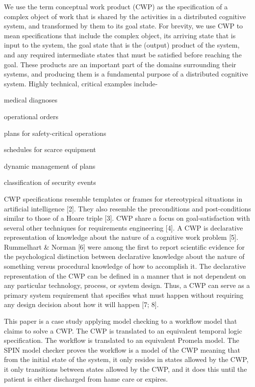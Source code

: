 We use the term conceptual work product (CWP) as the specification of a complex object of work that is shared by the activities in a distributed cognitive system, and transformed by them to its goal state. For brevity, we use CWP to mean specifications that include the complex object, its arriving state that is input to the system, the goal state that is the (output) product of the system, and any required intermediate states that must be satisfied before reaching the goal. These products are an important part of the domains surrounding their systems, and producing them is a fundamental purpose of a distributed cognitive system. Highly technical, critical examples include- 
\begin{compactitem}
\item medical diagnoses 
\item operational orders
\item plans for safety-critical operations 
\item schedules for scarce equipment
\item dynamic management of plans
\item classification of security events
\end{compactitem}
CWP specifications resemble templates or frames for stereotypical situations in artificial intelligence [2]. They also resemble the preconditions and post-conditions similar to those of a Hoare triple [3]. CWP share a focus on goal-satisfaction with several other techniques for requirements engineering [4]. 
A CWP is declarative representation of knowledge about the nature of a cognitive work problem [5]. Rummelhart & Norman [6] were among the first to report scientific evidence for the psychological distinction between declarative knowledge about the nature of something versus procedural knowledge of how to accomplish it. The declarative representation of the CWP can be defined in a manner that is not dependent on any particular technology, process, or system design. Thus, a CWP can serve as a primary system requirement that specifies what must happen without requiring any design decision about how it will happen [7; 8].

This paper is a case study applying model checking to a workflow model that claims to solve a CWP. The CWP is translated to an equivalent temporal logic specification. The workflow is translated to an equivalent Promela model. The SPIN model checker proves the workflow is a model of the CWP meaning that from the initial state of the system, it only resides in states allowed by the CWP, it only transitions between states allowed by the CWP, and it does this until the patient is either discharged from hame care or expires.

